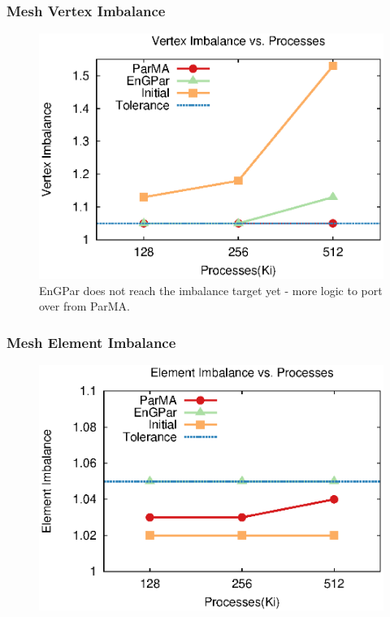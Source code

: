 \documentclass{beamer}
\begin{document}
\begin{frame}
  \frametitle{Mesh Vertex Imbalance}
  \begin{figure}
    \centering
    \includegraphics[width=.8\textwidth]{figures/vimb_v_cores.eps}\\
    EnGPar does not reach the imbalance target yet - more logic to port over from ParMA.
  \end{figure}  
\end{frame}

\begin{frame}
  \frametitle{Mesh Element Imbalance}
  \begin{figure}
    \centering
    \includegraphics[width=.8\textwidth]{figures/eimb_v_cores.eps}
  \end{figure}  
\end{frame}
\end{document}
